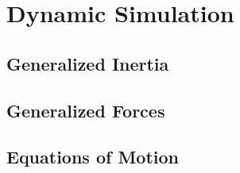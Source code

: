 \section{Dynamic Simulation}
\subsection{Generalized Inertia}
\subsection{Generalized Forces}
\subsection{Equations of Motion}

%

